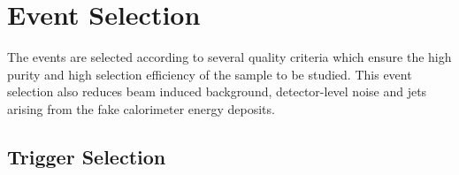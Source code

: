\section{Event Selection}
The events are selected according to several quality criteria which ensure the high purity and high selection efficiency of the sample to be studied. This event selection also reduces beam induced background, detector-level noise and jets arising from the fake calorimeter energy deposits. 

\subsection{Trigger Selection}

